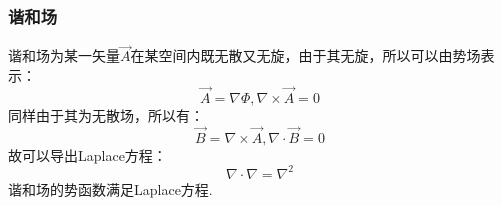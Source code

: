 \subsubsection{谐和场}
谐和场为某一矢量$\vec{A}$在某空间内既无散又无旋，由于其无旋，所以可以由势场表示：
\begin{equation}\label{VecAnl_eq28}
\vec{A}=\nabla\Phi,\nabla\times\vec{A}=0
\end{equation}
同样由于其为无散场，所以有：
\begin{equation}\label{VecAnl_eq29}
\vec{B}=\nabla\times\vec{A} ,\nabla\cdot\vec{B}=0
\end{equation}
故可以导出Laplace方程：
\begin{equation}\label{VecAnl_eq30}
\nabla\cdot\nabla=\nabla^2
\end{equation}
谐和场的势函数满足Laplace方程.
